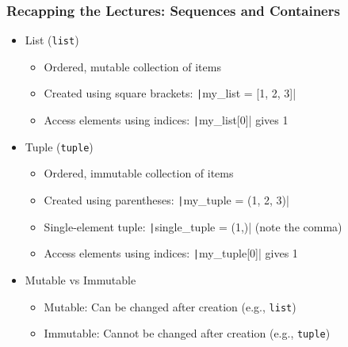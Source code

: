 \documentclass{beamer}
\begin{document}
\begin{frame}
    \frametitle{Recapping the Lectures: Sequences and Containers}
    \begin{itemize}
        \item List (\texttt{list})
              \begin{itemize}
                  \item Ordered, mutable collection of items
                  \item Created using square brackets: \texttt|my_list = [1, 2, 3]|
                  \item Access elements using indices: \texttt|my_list[0]| gives 1
              \end{itemize}
        \item Tuple (\texttt{tuple})
              \begin{itemize}
                  \item Ordered, immutable collection of items
                  \item Created using parentheses: \texttt|my_tuple = (1, 2, 3)|
                  \item Single-element tuple: \texttt|single_tuple = (1,)| (note the comma)
                  \item Access elements using indices: \texttt|my_tuple[0]| gives 1
              \end{itemize}
        \item Mutable vs Immutable
              \begin{itemize}
                  \item Mutable: Can be changed after creation (e.g., \texttt{list})
                  \item Immutable: Cannot be changed after creation (e.g., \texttt{tuple})
              \end{itemize}
    \end{itemize}
\end{frame}
\end{document}
